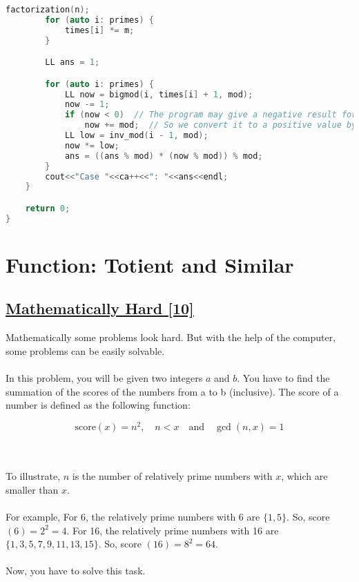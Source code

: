 \documentclass[10pt,a4paper]{article}
\begin{document}
\begin{itemize}
\begin{lstlisting}[language=C++, caption={Efficient Pseudo Code}, label={1st:code}, mathescape=true, breaklines=true]
        factorization(n);
        for (auto i: primes) {
            times[i] *= m;
        }

        LL ans = 1;

        for (auto i: primes) {
            LL now = bigmod(i, times[i] + 1, mod);
            now -= 1;
            if (now < 0)  // The program may give a negative result for modulo of negative numbers
                now += mod;  // So we convert it to a positive value by adding mod
            LL low = inv_mod(i - 1, mod);
            now *= low;
            ans = ((ans % mod) * (now % mod)) % mod;
        }
        cout<<"Case "<<ca++<<": "<<ans<<endl;
    }

    return 0;
}

\end{lstlisting}


\section{Function: Totient and Similar}
\subsection*{\href{https://lightoj.com/problem/mathematically-hard}{\underline{Mathematically Hard [10]}}}
Mathematically some problems look hard. But with the help of the computer, some problems can be easily solvable.
\\ \\
In this problem, you will be given two integers $a$ and $b$. You have to find the summation of the scores of the numbers from a to b (inclusive). The score of a number is defined as the following function:



\[
\text{score}(x) = n^2, \quad n < x \quad \text{and} \quad \gcd(n, x) = 1
\]



\\ \\
To illustrate, $n$ is the number of relatively prime numbers with $x$, which are smaller than $x$.
\\ \\
For example, For 6, the relatively prime numbers with 6 are $\{1, 5\}$. So, score $(6) = 2^2 = 4$. For 16, the relatively prime numbers with 16 are $\{1, 3, 5, 7, 9, 11, 13, 15\}$. So, score $(16) = 8^2 = 64$.
\\ \\
Now, you have to solve this task.


\end{itemize}
\end{document}
